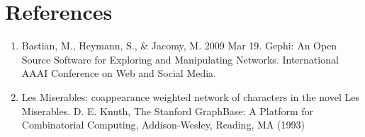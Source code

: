 \documentclass[11pt,a4paper,oneside]{article}
\begin{document}
    \section{References}
    \begin{enumerate}
    	\item Bastian, M., Heymann, S., \& Jacomy, M. 2009 Mar 19. Gephi: An Open Source Software for Exploring and Manipulating Networks. International AAAI Conference on Web and Social Media.
    	\item Les Miserables: coappearance weighted network of characters in the novel Les Miserables. D. E. Knuth, The Stanford GraphBase: A Platform for Combinatorial Computing, Addison-Wesley, Reading, MA (1993)
    \end{enumerate}
 

    
\end{document}
